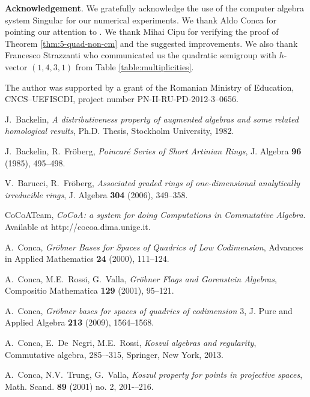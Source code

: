 \documentclass[12pt]{amsart}
\begin{document}
 
\medskip

{\bf Acknowledgement}.
We gratefully acknowledge the use of  the computer algebra system Singular \cite{Sing} for our numerical experiments. 
 We thank Aldo Conca for pointing our attention to \cite{Conca-quadrics-codim3}. We thank Mihai Cipu for verifying the proof of Theorem \ref{thm:5-quad-non-cm} 
and the suggested improvements. 
We   also thank  Francesco Strazzanti who communicated us the  quadratic semigroup with $h$-vector $(1,4,3,1)$ from Table \ref{table:multiplicities}.

The   author was  supported by  a grant of the Romanian Ministry of Education, CNCS--UEFISCDI, project number PN-II-RU-PD-2012-3--0656.
 

\medskip
\begin{thebibliography}{}
 
 J.~Backelin, \textit{A distributiveness property of augmented algebras  and some related homological results}, Ph.D. Thesis, Stockholm University, 1982.

 J.~Backelin, R.~Fr\"oberg, \textit{Poincar\'e Series of Short Artinian Rings}, J. Algebra {\bf 96} (1985), 495--498.
 
 V.~Barucci, R.~Fr\"oberg, \textit{Associated graded rings of one-dimensional analytically irreducible rings}, J. Algebra {\bf 304} (2006), 349--358.

 
 CoCoATeam, \textit{CoCoA: a system for doing Computations in Commutative Algebra}. Available at http://cocoa.dima.unige.it.

 A.~Conca, \textit{Gr\"obner Bases for Spaces of Quadrics of Low Codimension}, Advances in Applied Mathematics {\bf 24} (2000), 111--124.
 
 A.~Conca, M.E.~Rossi, G.~Valla, \textit{Gr\"obner Flags and Gorenstein Algebras}, Compositio Mathematica {\bf 129} (2001), 95--121.

  A.~Conca, \textit{Gr\"obner bases for spaces of quadrics of codimension $3$}, J. Pure and Applied Algebra {\bf 213} (2009), 1564--1568.

 A.~Conca, E.~De~Negri, M.E.~Rossi, \textit{Koszul algebras and regularity}, Commutative algebra, 285–-315, Springer, New York, 2013.
 
 A.~Conca, N.V.~Trung, G.~Valla, \textit{Koszul property for points in projective spaces}, Math. Scand. {\bf 89} (2001) no. 2, 201-–216. 
 

\end{thebibliography}
\end{document}
